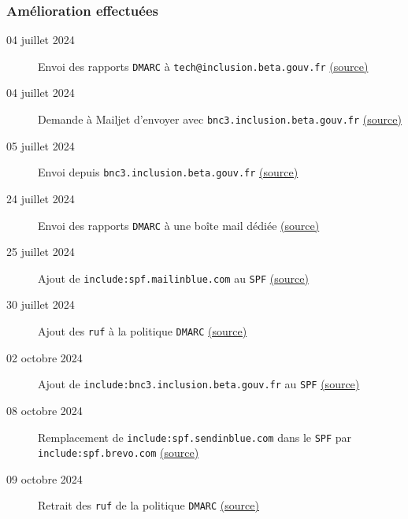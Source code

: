 \documentclass{beamer}
\begin{document}
\begin{frame}[fragile]
    \frametitle{Amélioration effectuées}
    \begin{description}
        \item[\footnotesize 04 juillet 2024] \small Envoi des rapports \texttt{DMARC} à \texttt{tech@inclusion.beta.gouv.fr} \href{https://itou-inclusion.slack.com/archives/C0412CTV63D/p1720017179142469}{(source)}
        \item[\footnotesize 04 juillet 2024] \small Demande à Mailjet d'envoyer avec \texttt{bnc3.inclusion.beta.gouv.fr} \href{https://app.mailjet.com/support/ticket/3086287}{(source)}
        \item[\footnotesize 05 juillet 2024] \small Envoi depuis \texttt{bnc3.inclusion.beta.gouv.fr} \href{https://app.mailjet.com/support/ticket/3086287}{(source)}
        \item[\footnotesize 24 juillet 2024] \small Envoi des rapports \texttt{DMARC} à une boîte mail dédiée \href{https://itou-inclusion.slack.com/archives/C0412CTV63D/p1721642195612449}{(source)}
        \item[\footnotesize 25 juillet 2024] \small Ajout de \texttt{include:spf.mailinblue.com} au \texttt{SPF} \href{https://mattermost.incubateur.net/betagouv/pl/cd8qzuqf63g7pxx61atwxs5hby}{(source)}
        \item[\footnotesize 30 juillet 2024] \small Ajout des \texttt{ruf} à la politique \texttt{DMARC} \href{https://itou-inclusion.slack.com/archives/C0412CTV63D/p1722332747632659}{(source)}
        \item[\footnotesize 02 octobre 2024] \small Ajout de \texttt{include:bnc3.inclusion.beta.gouv.fr} au \texttt{SPF} \href{https://itou-inclusion.slack.com/docs/TQ3MK2T9S/F07Q3HANGTE}{(source)}
        \item[\footnotesize 08 octobre 2024] \small Remplacement de \texttt{include:spf.sendinblue.com} dans le \texttt{SPF} par \texttt{include:spf.brevo.com} \href{https://mattermost.incubateur.net/betagouv/pl/8ys763r4ijygb81asch4sf5kxc}{(source)}
        \item[\footnotesize 09 octobre 2024] \small Retrait des \texttt{ruf} de la politique \texttt{DMARC} \href{https://itou-inclusion.slack.com/archives/C0412CTV63D/p1728461567901209}{(source)}
    \end{description}
\end{frame}
\end{document}
